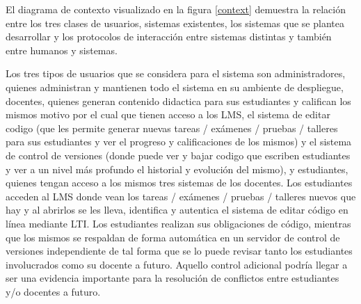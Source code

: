 El diagrama de contexto visualizado en la figura \ref{context} demuestra la relación entre los tres clases de usuarios, sistemas existentes, los sistemas que se plantea desarrollar y los protocolos de interacción entre sistemas distintas y también entre humanos y sistemas.

      
Los tres tipos de usuarios que se considera para el sistema son administradores, quienes administran y mantienen todo el sistema en su ambiente de despliegue, docentes, quienes generan contenido didactica para sus estudiantes y califican los mismos motivo por el cual que tienen acceso a los LMS, el sistema de editar codigo (que les permite generar nuevas tareas / exámenes / pruebas / talleres para sus estudiantes y ver el progreso y calificaciones de los mismos) y el sistema de control de versiones (donde puede ver y bajar codigo que escriben estudiantes y ver a un nivel más profundo el historial y evolución del mismo), y estudiantes, quienes tengan acceso a los mismos tres sistemas de los docentes. Los estudiantes acceden al LMS  donde vean los tareas / exámenes / pruebas / talleres nuevos que hay y al abrirlos se les lleva, identifica y autentica el sistema de editar código en línea mediante LTI. Los estudiantes realizan sus obligaciones de código, mientras que los mismos se respaldan de forma automática en un servidor de control de versiones independiente de tal forma que se lo puede revisar tanto los estudiantes involucrados como su docente a futuro. Aquello control adicional podría llegar a ser una evidencia importante para la resolución de conflictos entre estudiantes y/o docentes a futuro.

